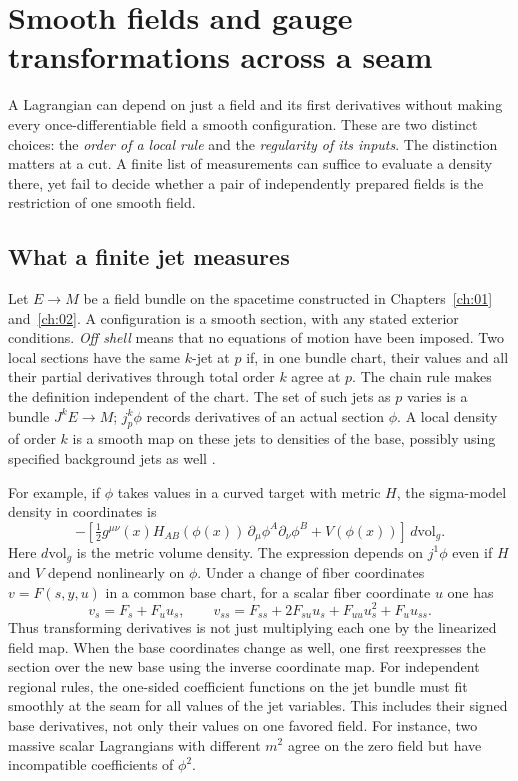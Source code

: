 \chapter{Smooth fields and gauge transformations across a seam}\label{ch:03}

A Lagrangian can depend on just a field and its first derivatives without making every once-differentiable field a smooth configuration. These are two distinct choices: the \emph{order of a local rule} and the \emph{regularity of its inputs}. The distinction matters at a cut. A finite list of measurements can suffice to evaluate a density there, yet fail to decide whether a pair of independently prepared fields is the restriction of one smooth field.

\section{What a finite jet measures}

Let $E\to M$ be a field bundle on the spacetime constructed in Chapters~\ref{ch:01} and~\ref{ch:02}. A configuration is a smooth section, with any stated exterior conditions. \emph{Off shell} means that no equations of motion have been imposed. Two local sections have the same $k$-jet at $p$ if, in one bundle chart, their values and all their partial derivatives through total order $k$ agree at $p$. The chain rule makes the definition independent of the chart. The set of such jets as $p$ varies is a bundle $J^k E\to M$; $j^k_p\phi$ records derivatives of an actual section $\phi$. A local density of order $k$ is a smooth map on these jets to densities of the base, possibly using specified background jets as well \cite{GMS}.

For example, if $\phi$ takes values in a curved target with metric $H$, the sigma-model density in coordinates is
\[
 -\left[\tfrac12 g^{\mu\nu}(x) H_{AB}(\phi(x))\,
       \partial_\mu\phi^A\partial_\nu\phi^B+V(\phi(x))\right]
       \,d\mathrm{vol}_g .
\]
Here $d\mathrm{vol}_g$ is the metric volume density. The expression depends on $j^1\phi$ even if $H$ and $V$ depend nonlinearly on $\phi$. Under a change of fiber coordinates $v=F(s,y,u)$ in a common base chart, for a scalar fiber coordinate $u$ one has
\[
 v_s=F_s+F_u u_s,\qquad
 v_{ss}=F_{ss}+2F_{su}u_s+F_{uu}u_s^2+F_u u_{ss} .
\]
Thus transforming derivatives is not just multiplying each one by the linearized field map. When the base coordinates change as well, one first reexpresses the section over the new base using the inverse coordinate map. For independent regional rules, the one-sided coefficient functions on the jet bundle must fit smoothly at the seam for all values of the jet variables. This includes their signed base derivatives, not only their values on one favored field. For instance, two massive scalar Lagrangians with different $m^2$ agree on the zero field but have incompatible coefficients of $\phi^2$.

